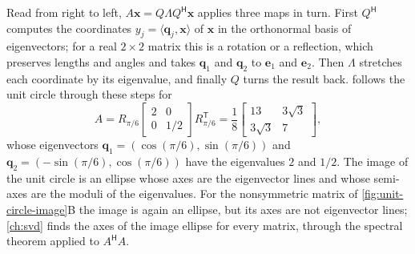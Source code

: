 Read from right to left, $A\mathbf x=Q\Lambda Q^{\mathsf H}\mathbf x$ applies three maps in turn. First $Q^{\mathsf H}$ computes the coordinates $y_j=\langle\mathbf q_j,\mathbf x\rangle$ of $\mathbf x$ in the orthonormal basis of eigenvectors; for a real $2\times2$ matrix this is a rotation or a reflection, which preserves lengths and angles and takes $\mathbf q_1$ and $\mathbf q_2$ to $\mathbf e_1$ and $\mathbf e_2$. Then $\Lambda$ stretches each coordinate by its eigenvalue, and finally $Q$ turns the result back.  follows the unit circle through these steps for
\[
A=R_{\pi/6}\begin{bmatrix}2&0\\0&1/2\end{bmatrix}R_{\pi/6}^{\mathsf T}=\frac18\begin{bmatrix}13&3\sqrt3\\3\sqrt3&7\end{bmatrix},
\]
whose eigenvectors $\mathbf q_1=(\cos(\pi/6),\sin(\pi/6))$ and $\mathbf q_2=(-\sin(\pi/6),\cos(\pi/6))$ have the eigenvalues $2$ and $1/2$. The image of the unit circle is an ellipse whose axes are the eigenvector lines and whose semi-axes are the moduli of the eigenvalues. For the nonsymmetric matrix of \cref{fig:unit-circle-image}B the image is again an ellipse, but its axes are not eigenvector lines; \cref{ch:svd} finds the axes of the image ellipse for every matrix, through the spectral theorem applied to $A^{\mathsf H}A$.

